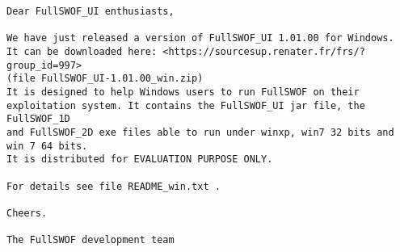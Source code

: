 \documentclass[a4paper, 11pt]{article}
\begin{document}
\begin{enumerate}
\begin{verbatim}
Dear FullSWOF_UI enthusiasts,

We have just released a version of FullSWOF_UI 1.01.00 for Windows.
It can be downloaded here: <https://sourcesup.renater.fr/frs/?group_id=997>
(file FullSWOF_UI-1.01.00_win.zip)
It is designed to help Windows users to run FullSWOF on their 
exploitation system. It contains the FullSWOF_UI jar file, the FullSWOF_1D   
and FullSWOF_2D exe files able to run under winxp, win7 32 bits and 
win 7 64 bits.
It is distributed for EVALUATION PURPOSE ONLY.

For details see file README_win.txt .

Cheers.

The FullSWOF development team 
\end{verbatim}
\end{enumerate}

\end{document}
